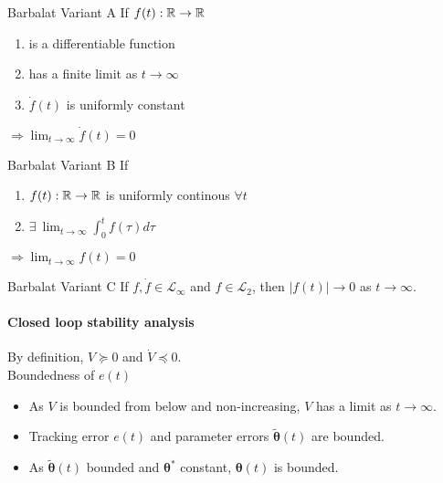 \begin{lemma}{Barbalat Variant A}
If $f(t): \mathbb{R} \rightarrow \mathbb{R}$
\begin{enumerate}
\item is a differentiable function
\item has a finite limit as $t \rightarrow \infty$ 
\item $\dot{f}(t)$ is uniformly constant
\end{enumerate}
$\Rightarrow \lim_{t \rightarrow \infty} \dot{f}(t) = 0$\\
\end{lemma}

\begin{lemma}{Barbalat Variant B}
If
\begin{enumerate}
\item $f(t): \mathbb{R} \rightarrow \mathbb{R}$ is uniformly continous $\forall t$
\item $\exists~ \lim_{t \rightarrow \infty} \int_0^t f(\tau) d\tau$
\end{enumerate}
$\Rightarrow \lim_{t \rightarrow \infty} f(t) = 0$\\
\end{lemma}

\begin{lemma}{Barbalat Variant C}
If $f, \dot{f} \in \mathcal{L}_\infty$ 
and $f \in \mathcal{L}_2$,
then  $|f(t)| \rightarrow 0$ as $t \rightarrow \infty$.
\end{lemma}
\paragraph{Closed loop stability analysis}
By definition, $V \succeq 0$ and $\dot{V} \preceq 0$.\\

Boundedness of $e(t)$
\begin{itemize}
\item As $V$ is bounded from below and non-increasing,
    $V$ has a limit as $t \rightarrow \infty$.
\item Tracking error $e(t)$ and parameter errors $ \tilde{\bm{\theta}}(t)$
    are bounded.
\item As $\tilde{\bm{\theta}}(t)$ bounded and $\bm{\theta}^*$ constant,
    $\bm{\theta}(t)$ is bounded.
\end{itemize}~

